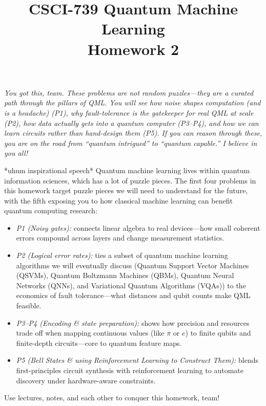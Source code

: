 \documentclass[11pt]{article}
\title{CSCI-739 Quantum Machine Learning\\[2pt]
\large Homework 2}
\date{} %
\newcounter{problem}
\begin{document}
\maketitle

\begin{center}
\textit{You got this, team. These problems are not random puzzles—they are a curated path through the pillars of QML. You will see how noise shapes computation (and is a headache) (P1), why fault-tolerance is the gatekeeper for real QML at scale (P2), how data actually gets \emph{into} a quantum computer (P3--P4), and how we can \emph{learn} circuits rather than hand-design them (P5). If you can reason through these, you are on the road from “quantum intrigued” to “quantum capable.” I believe in you all! \smiley{}}
\end{center}

\vspace{1em}

\noindent
*uhum inspirational speech* \newline
Quantum machine learning lives within quantum information sciences, which has a lot of puzzle pieces. The first four problems in this homework target puzzle pieces we will need to understand for the future, with the fifth exposing you to how classical machine learning can benefit quantum computing research:
\begin{itemize}
  \item \emph{P1 (Noisy gates):} connects linear algebra to real devices—how small coherent errors compound across layers and change measurement statistics.
  \item \emph{P2 (Logical error rates):} ties a subset of quantum machine learning algorithms we will eventually discuss (Quantum Support Vector Machines (QSVMs), Quantum Boltzmann Machines (QBMs), Quantum Neural Networks (QNNs), and Variational Quantum Algorithms (VQAs)) to the economics of fault tolerance—what distances and qubit counts make QML feasible.
  \item \emph{P3--P4 (Encoding \& state preparation):} shows how precision and resources trade off when mapping continuous values (like $\pi$ or $e$) to finite qubits and finite-depth circuits—core to quantum feature maps.
  \item \emph{P5 (Bell States \& using Reinforcement Learning to Construct Them):} blends first-principles circuit synthesis with reinforcement learning to automate discovery under hardware-aware constraints.
\end{itemize}
Use lectures, notes, and each other to conquer this homework, team! \smiley{}
\end{document}
